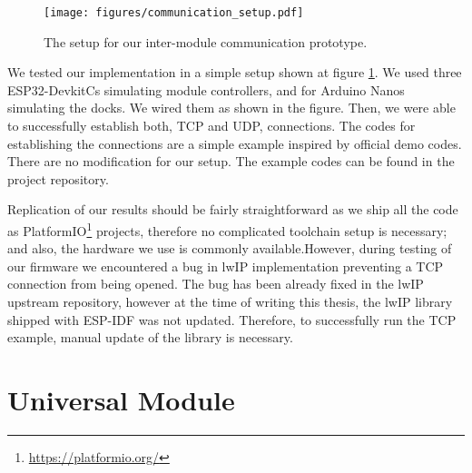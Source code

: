 \begin{figure}[!t]
    \centering
    \texttt{[image: figures/communication\_setup.pdf]}
    \caption{The setup for our inter-module communication prototype.}
    \label{fig:comm_setup}
\end{figure}

We tested our implementation in a simple setup shown at figure
\ref{fig:comm_setup}. We used three ESP32-DevkitCs simulating module
controllers, and for Arduino Nanos simulating the docks. We wired them as shown
in the figure. Then, we were able to successfully establish both, TCP and UDP,
connections. The codes for establishing the connections are a simple example
inspired by official demo codes. There are no modification for our setup. The
example codes can be found in the project repository.

Replication of our results should be fairly straightforward as we ship all the
code as PlatformIO\footnote{\url{https://platformio.org/}} projects, therefore
no complicated toolchain setup is necessary; and also, the hardware we use is
commonly available.However, during testing of our firmware we encountered a bug
in lwIP implementation preventing a TCP connection from being opened. The bug
has been already fixed in the lwIP upstream repository, however at the time of
writing this thesis, the lwIP library shipped with ESP-IDF was not updated.
Therefore, to successfully run the TCP example, manual update of the library is
necessary.

\section{Universal Module}
